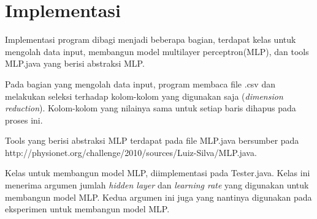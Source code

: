 
\section{Implementasi}
Implementasi program dibagi menjadi beberapa bagian, terdapat kelas untuk mengolah data input, membangun model multilayer perceptron(MLP), dan tools MLP.java yang berisi abstraksi MLP.

Pada bagian yang mengolah data input, program membaca file .csv dan melakukan seleksi terhadap kolom-kolom yang digunakan saja (\textit{dimension reduction}). Kolom-kolom yang nilainya sama untuk setiap baris dihapus pada proses ini.

Tools yang berisi abstraksi MLP terdapat pada file MLP.java bersumber pada http://physionet.org/challenge/2010/sources/Luiz-Silva/MLP.java.

Kelas untuk membangun model MLP, diimplementasi pada Tester.java. Kelas ini menerima argumen jumlah \textit{hidden layer} dan \textit{learning rate} yang digunakan untuk membangun model MLP. Kedua argumen ini juga yang nantinya digunakan pada eksperimen untuk membangun model MLP.
